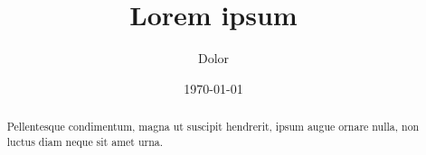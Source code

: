 \documentclass[a4paper]{article}
\title{Lorem ipsum}
\author{Dolor}
\date{\today}
\begin{document}
\maketitle

\begin{abstract}
Pellentesque condimentum, magna ut suscipit hendrerit, ipsum augue ornare nulla, non luctus diam neque sit amet urna.
\end{abstract}

\tableofcontents
\end{document}
